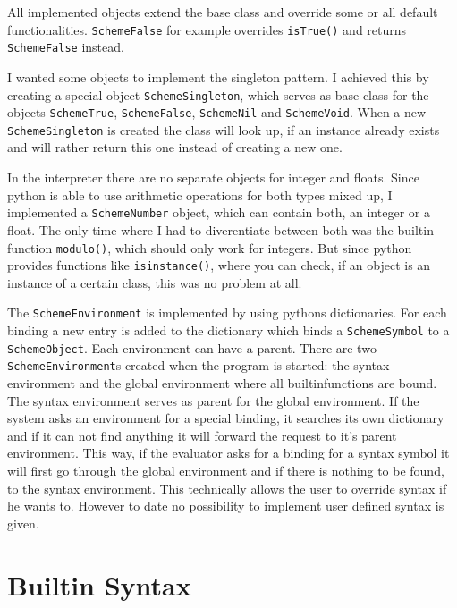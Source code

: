 \documentclass[12pt,a4paper]{scrartcl}
\begin{document}
All implemented objects extend the base class and override some or all default functionalities. \lstinline{SchemeFalse} for example overrides \lstinline{isTrue()} and returns \lstinline{SchemeFalse} instead.

I wanted some objects to implement the singleton pattern. I achieved this by creating a special object \lstinline{SchemeSingleton}, which serves as base class for the objects \lstinline{SchemeTrue}, \lstinline{SchemeFalse}, \lstinline{SchemeNil} and \lstinline{SchemeVoid}. When a new \lstinline{SchemeSingleton} is created the class will look up, if an instance already exists and will rather return this one instead of creating a new one. 

In the interpreter there are no separate objects for integer and floats. Since python is able to use arithmetic operations for both types mixed up, I implemented a \lstinline{SchemeNumber} object, which can contain both, an integer or a float. The only time where I had to diverentiate between both was the builtin function \lstinline{modulo()}, which should only work for integers. But since python provides functions like \lstinline{isinstance()}, where you can check, if an object is an instance of a certain class, this was no problem at all.

The \lstinline{SchemeEnvironment} is implemented by using pythons dictionaries. For each binding a new entry is added to the dictionary which binds a \lstinline{SchemeSymbol} to a \lstinline{SchemeObject}. Each environment can have a parent. There are two \lstinline{SchemeEnvironment}s created when the program is started: the syntax environment and the global environment where all builtinfunctions are bound. The syntax environment serves as parent for the global environment. If the system asks an environment for a special binding, it searches its own dictionary and if it can not find anything it will forward the request to it's parent environment. This way, if the evaluator asks for a binding for a syntax symbol it will first go through the global environment and if there is nothing to be found, to the syntax environment. This technically allows the user to override syntax if he wants to. However to date no possibility to implement user defined syntax is given. 


\newpage
\section{Builtin Syntax}
\end{document}
